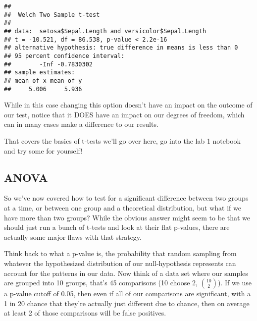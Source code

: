 \documentclass[
]{article}
\newenvironment{Shaded}{\begin{snugshade}}{\end{snugshade}}
\newcommand{\DataTypeTok}[1]{\textcolor[rgb]{0.13,0.29,0.53}{#1}}
\newcommand{\KeywordTok}[1]{\textcolor[rgb]{0.13,0.29,0.53}{\textbf{#1}}}
\newcommand{\NormalTok}[1]{#1}
\newcommand{\OperatorTok}[1]{\textcolor[rgb]{0.81,0.36,0.00}{\textbf{#1}}}
\newcommand{\OtherTok}[1]{\textcolor[rgb]{0.56,0.35,0.01}{#1}}
\newcommand{\StringTok}[1]{\textcolor[rgb]{0.31,0.60,0.02}{#1}}
\begin{document}
\begin{Shaded}
\end{Shaded}

\begin{verbatim}
## 
##  Welch Two Sample t-test
## 
## data:  setosa$Sepal.Length and versicolor$Sepal.Length
## t = -10.521, df = 86.538, p-value < 2.2e-16
## alternative hypothesis: true difference in means is less than 0
## 95 percent confidence interval:
##        -Inf -0.7830302
## sample estimates:
## mean of x mean of y 
##     5.006     5.936
\end{verbatim}

While in this case changing this option doesn't have an impact on the
outcome of our test, notice that it DOES have an impact on our degrees
of freedom, which can in many cases make a difference to our results.

That covers the basics of t-tests we'll go over here, go into the lab 1
notebook and try some for yourself!

\hypertarget{anova}{%
\subsection{ANOVA}\label{anova}}

So we've now covered how to test for a significant difference between
two groups at a time, or between one group and a theoretical
distribution, but what if we have more than two groups? While the
obvious answer might seem to be that we should just run a bunch of
t-tests and look at their flat p-values, there are actually some major
flaws with that strategy.

Think back to what a p-value is, the probability that random sampling
from whatever the hypothesized distribution of our null-hypothesis
represents can account for the patterns in our data. Now think of a data
set where our samples are grouped into 10 groups, that's 45 comparisons
(10 choose 2, \({10\choose2}\)). If we use a p-value cutoff of 0.05,
then even if all of our comparisons are significant, with a 1 in 20
chance that they're actually just different due to chance, then on
average at least 2 of those comparisons will be false positives.
\end{document}
